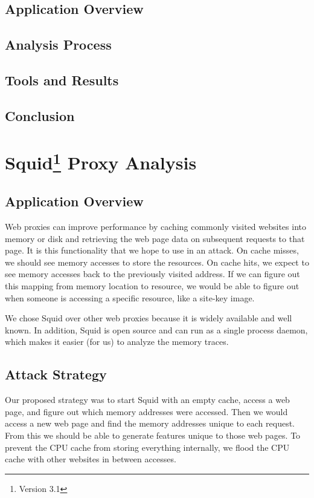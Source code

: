 \documentclass[11pt, oneside]{article}
\begin{document}
\subsection{Application Overview}
\subsection{Analysis Process}
\subsection{Tools and Results}
\subsection{Conclusion}

\section[Squid Proxy Analysis]{Squid\footnote{Version 3.1} Proxy Analysis}
\subsection{Application Overview}
Web proxies can improve performance by caching commonly visited websites 
into memory or disk and retrieving the web page data on subsequent requests 
to that page. It is this functionality that we hope to use in an attack. On 
cache misses, we should see memory accesses to store the resources. On 
cache hits, we expect to see memory accesses back to the previously visited
address. If we can figure out this mapping from memory location to resource,
we would be able to figure out when someone is accessing a specific resource, 
like a site-key image.

We chose Squid over other web proxies because it is widely available and well 
known. In addition, Squid is open source and can run as a single process 
daemon, which makes it easier (for us) to analyze the memory traces.

\subsection{Attack Strategy}
Our proposed strategy was to start Squid with an empty cache, access a web 
page, and figure out which memory addresses were accessed. Then we would
access a new web page and find the memory addresses unique to each request. 
From this we should be able to generate features unique to those web pages.
To prevent the CPU cache from storing everything internally, we flood the
CPU cache with other websites in between accesses.
\end{document}
